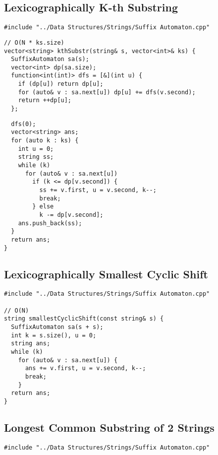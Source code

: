 \documentclass[twoside]{article}
\begin{document}
\begin{multicols*}{2}
\subsectionfont{\large\bfseries\sffamily\underline}
\subsection*{Lexicographically K-th Substring}
\begin{verbatim}
#include "../Data Structures/Strings/Suffix Automaton.cpp"
\end{verbatim}
\vspace{-12pt}
\begin{verbatim}
// O(N * ks.size)
vector<string> kthSubstr(string& s, vector<int>& ks) {
  SuffixAutomaton sa(s);
  vector<int> dp(sa.size);
  function<int(int)> dfs = [&](int u) {
    if (dp[u]) return dp[u];
    for (auto& v : sa.next[u]) dp[u] += dfs(v.second);
    return ++dp[u];
  };
\end{verbatim}
\vspace{-12pt}
\begin{verbatim}
  dfs(0);
  vector<string> ans;
  for (auto k : ks) {
    int u = 0;
    string ss;
    while (k)
      for (auto& v : sa.next[u])
        if (k <= dp[v.second]) {
          ss += v.first, u = v.second, k--;
          break;
        } else
          k -= dp[v.second];
    ans.push_back(ss);
  }
  return ans;
}
\end{verbatim}

\subsectionfont{\large\bfseries\sffamily\underline}
\subsection*{Lexicographically Smallest Cyclic Shift}
\begin{verbatim}
#include "../Data Structures/Strings/Suffix Automaton.cpp"

// O(N)
string smallestCyclicShift(const string& s) {
  SuffixAutomaton sa(s + s);
  int k = s.size(), u = 0;
  string ans;
  while (k)
    for (auto& v : sa.next[u]) {
      ans += v.first, u = v.second, k--;
      break;
    }
  return ans;
}
\end{verbatim}

\subsectionfont{\large\bfseries\sffamily\underline}
\subsection*{Longest Common Substring of 2 Strings}
\begin{verbatim}
#include "../Data Structures/Strings/Suffix Automaton.cpp"


\end{verbatim}
\end{multicols*}
\end{document}
